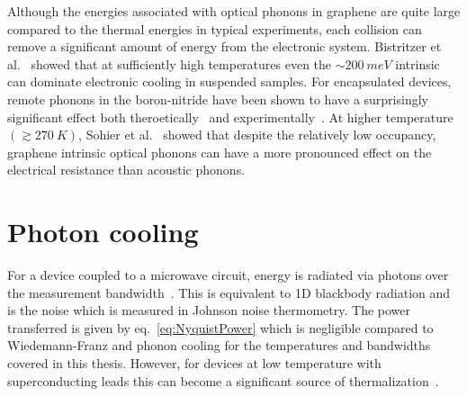 Although the energies associated with optical phonons in graphene are quite large compared to the thermal energies in typical experiments, each collision can remove a significant amount of energy from the electronic system. Bistritzer et al.~\cite{bistritzer_electronic_2009} showed that at sufficiently high temperatures even the ${\sim200}~meV$ intrinsic can dominate electronic cooling in suspended samples. For encapsulated devices, remote phonons in the boron-nitride have been shown to have a surprisingly significant effect both theroetically~\cite{viljas_electron-phonon_2010, bistritzer_electronic_2009, low_cooling_2012} and experimentally~\cite{tielrooij_out--plane_2017}. At higher temperature $\left( \gtrsim 270~K\right)$, Sohier et al.~\cite{sohier_phonon-limited_2014} showed that despite the relatively low occupancy, graphene intrinsic optical phonons can have a more pronounced effect on the electrical resistance than acoustic phonons.

\section{Photon cooling}
For a device coupled to a microwave circuit, energy is radiated via photons over the measurement bandwidth~\cite{schmidt_photon-mediated_2004, mckitterick_prospects_2015}. This is equivalent to 1D blackbody radiation and is the noise which is measured in Johnson noise thermometry. The power transferred is given by eq.~\ref{eq:NyquistPower} which is negligible compared to Wiedemann-Franz and phonon cooling for the temperatures and bandwidths covered in this thesis. However, for devices at low temperature with superconducting leads this can become a significant source of thermalization~\cite{mckitterick_prospects_2015}.

